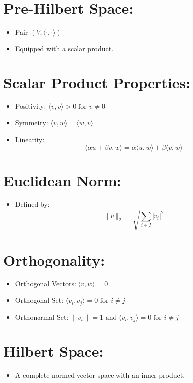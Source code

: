 \documentclass{article}
\begin{document}
\section{Pre-Hilbert Space:}
\begin{itemize}
    \item Pair $\left( V, \langle \cdot, \cdot \rangle \right)$
    \item Equipped with a scalar product.
\end{itemize}

\section{Scalar Product Properties:}
\begin{itemize}
    \item Positivity: $\langle v, v \rangle > 0 \text{ for } v \neq 0$
    \item Symmetry: $\langle v, w \rangle = \langle w, v \rangle$
    \item Linearity:
    \[
    \langle \alpha u + \beta v, w \rangle = \alpha \langle u, w \rangle + \beta \langle v, w \rangle
    \]
\end{itemize}

\section{Euclidean Norm:}
\begin{itemize}
    \item Defined by:
    \[
    \|v\|_2 = \sqrt{\sum_{i \in I} |v_i|^2}
    \]
\end{itemize}

\section{Orthogonality:}
\begin{itemize}
    \item Orthogonal Vectors: $\langle v, w \rangle = 0$
    \item Orthogonal Set: $\langle v_i, v_j \rangle = 0 \text{ for } i \neq j$
    \item Orthonormal Set: $\|v_i\| = 1 \text{ and } \langle v_i, v_j \rangle = 0 \text{ for } i \neq j$
\end{itemize}




\section{Hilbert Space:}
\begin{itemize}
    \item A complete normed vector space with an inner product.
\end{itemize}
\end{document}

